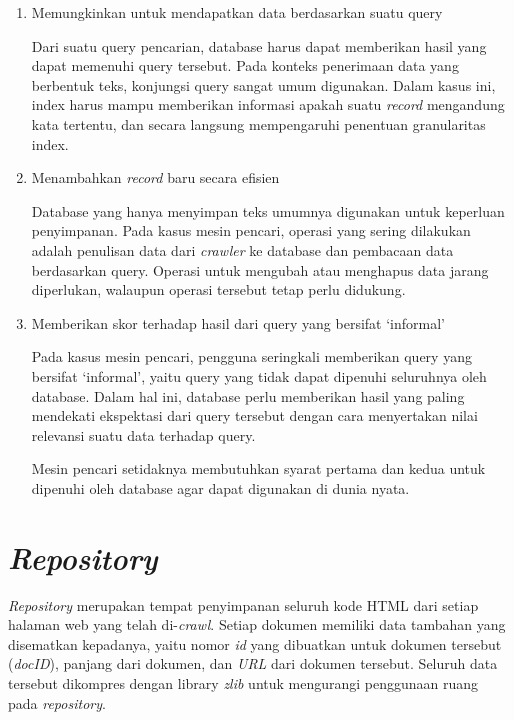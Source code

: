 \begin{enumerate}
  \item{Memungkinkan untuk mendapatkan data berdasarkan suatu query}

  Dari suatu query pencarian, database harus dapat memberikan hasil yang dapat
  memenuhi query tersebut. Pada konteks penerimaan data yang berbentuk teks,
  konjungsi query sangat umum digunakan. Dalam kasus ini, index harus mampu
  memberikan informasi apakah suatu \emph{record} mengandung kata tertentu, dan
  secara langsung mempengaruhi penentuan granularitas index.

  \item{Menambahkan \emph{record} baru secara efisien}

  Database yang hanya menyimpan teks umumnya digunakan untuk keperluan
  penyimpanan. Pada kasus mesin pencari, operasi yang sering dilakukan adalah
  penulisan data dari \emph{crawler} ke database dan pembacaan data berdasarkan
  query. Operasi untuk mengubah atau menghapus data jarang diperlukan, walaupun
  operasi tersebut tetap perlu didukung.

  \item{Memberikan skor terhadap hasil dari query yang bersifat `informal'}

  Pada kasus mesin pencari, pengguna seringkali memberikan query yang bersifat
  `informal', yaitu query yang tidak dapat dipenuhi seluruhnya oleh database.
  Dalam hal ini, database perlu memberikan hasil yang paling mendekati
  ekspektasi dari query tersebut dengan cara menyertakan nilai relevansi suatu
  data terhadap query.

  Mesin pencari setidaknya membutuhkan syarat pertama dan kedua untuk dipenuhi
  oleh database agar dapat digunakan di dunia nyata.

\end{enumerate}

\section{\emph{Repository}}

\emph{Repository} merupakan tempat penyimpanan seluruh kode HTML dari setiap
halaman web yang telah di-\emph{crawl}. Setiap dokumen memiliki data tambahan
yang disematkan kepadanya, yaitu nomor \emph{id} yang dibuatkan untuk dokumen
tersebut (\textit{docID}), panjang dari dokumen, dan \emph{URL} dari dokumen
tersebut. Seluruh data tersebut dikompres dengan library \emph{zlib} untuk
mengurangi penggunaan ruang pada \emph{repository}.

